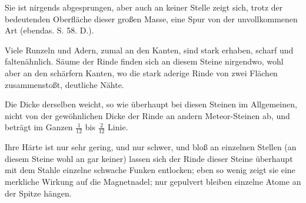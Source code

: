\documentclass[a4paper, 11pt, oneside, german]{article}
\begin{document}
Sie ist nirgends abgesprungen, aber auch an keiner Stelle zeigt sich, trotz der bedeutenden Oberfläche dieser großen Masse, eine Spur von der unvollkommenen Art (ebendas. S. 58. D.).

Viele Runzeln und Adern, zumal an den Kanten, sind stark erhaben, scharf und faltenähnlich. Säume der Rinde finden sich an diesem Steine nirgendwo, wohl aber an den schärfern Kanten, wo die stark aderige Rinde von zwei Flächen zusammenstoßt, deutliche Nähte.

Die Dicke derselben weicht, so wie überhaupt bei diesen Steinen im Allgemeinen, nicht von der gewöhnlichen Dicke der Rinde an andern Meteor-Steinen ab, und beträgt im Ganzen $\frac{1}{12}$ bis $\frac{2}{12}$ Linie.

Ihre Härte ist nur sehr gering, und nur schwer, und bloß an einzelnen Stellen (an diesem Steine wohl an gar keiner) lassen sich der Rinde dieser Steine überhaupt mit dem Stahle einzelne schwache Funken entlocken; eben so wenig zeigt sie eine merkliche Wirkung auf die Magnetnadel; nur gepulvert bleiben einzelne Atome an der Spitze hängen.
\end{document}
